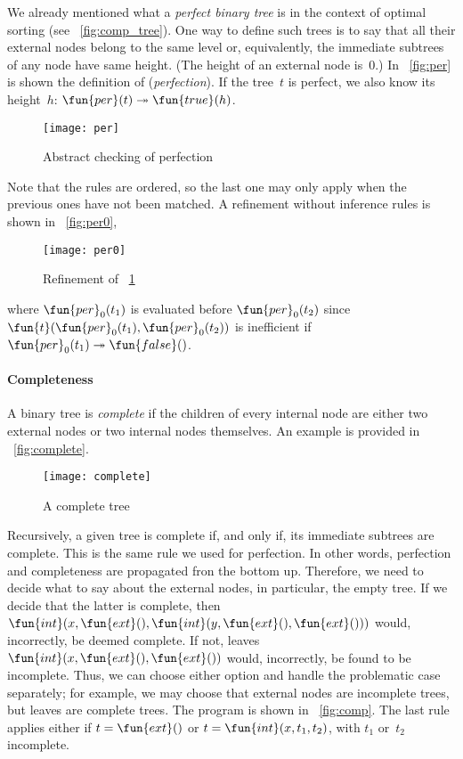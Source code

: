  We already mentioned what a
\emph{perfect binary tree} is in the context of optimal sorting (see
\fig~\vref{fig:comp_tree}). One way to define such trees is to say
that all their external nodes belong to the same level or,
equivalently, the immediate subtrees of any node have same
height. (The height of an
external node is~\(0\).) In \fig~\vref{fig:per} is shown the
definition of  (\emph{perfection}).
If the tree~\(t\) is perfect, we also know its height~\(h\):
\(\fun{per}(t) \twoheadrightarrow \fun{true}(h)\).
\begin{figure}[b]
\centering
\texttt{[image: per]}
\caption{Abstract checking of perfection}
\label{fig:per}
\end{figure}
Note that the rules are ordered, so the last one may only apply when
the previous ones have not been matched. A refinement without
inference rules is shown in \fig~\vref{fig:per0},
\begin{figure}
\centering
\texttt{[image: per0]}
\caption{Refinement of \fig~\ref{fig:per}}
\label{fig:per0}
\end{figure}
where \(\fun{per}_0(t_1)\) is evaluated before
\(\fun{per}_0(t_2)\) since
\(\fun{t}(\fun{per}_0(t_1), \fun{per}_0(t_2))\) is inefficient if
\(\fun{per}_0(t_1) \twoheadrightarrow \fun{false}()\).


\paragraph{Completeness}

A binary tree is \emph{complete} if
the children of every internal node are either two external nodes or
two internal nodes themselves. An example is provided in
\fig~\vref{fig:complete}.
%
\begin{wrapfigure}[8]{r}[0pt]{0pt}
\centering
\texttt{[image: complete]}
\caption{A complete tree}
\label{fig:complete}
\end{wrapfigure}
Recursively, a given tree is complete if, and only if, its immediate
subtrees are complete. This is the same rule we used for
perfection. In other words, perfection and completeness are propagated
fron the bottom up. Therefore, we need to decide what to say about the
external nodes, in particular, the empty tree. If we decide that the
latter is complete, then
\(\fun{int}(x,\fun{ext}(),\fun{int}(y,\fun{ext}(),\fun{ext}()))\)
would, incorrectly, be deemed complete. If not, leaves \(\fun{int}(x,\fun{ext}(),\fun{ext}())\) would,
incorrectly, be found to be incomplete. Thus, we can choose either
option and handle the problematic case separately; for example, we may
choose that external nodes are incomplete trees, but leaves are
complete trees. The program is shown in \fig~\vref{fig:comp}. The last
rule applies either if \(t=\fun{ext}()\) or
\(t=\fun{int}(x,t_1,t_2)\), with \(t_1\) or~\(t_2\) incomplete.

